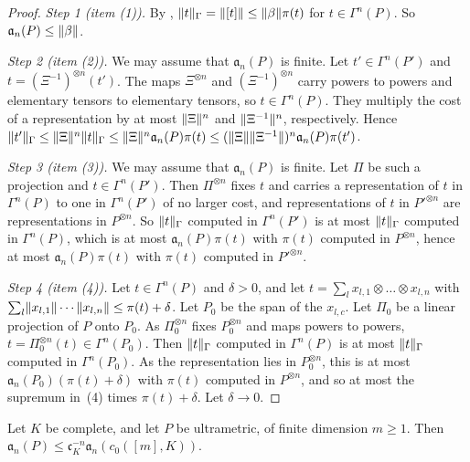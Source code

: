 \begin{proof}
\emph{Step 1 (item (1)).} By \cite[Lemma~Q.1(3)]{I}, $\lVert t\rVert_\Gamma=\lVert [t]\rVert\le\lVert \beta\rVert\pi(t)$ for $t\in\Gamma^n(P)$. So $\mathfrak a_n(P)\le\lVert \beta\rVert$.

\emph{Step 2 (item (2)).} We may assume that $\mathfrak a_n(P)$ is finite. Let $t'\in\Gamma^n(P')$ and $t=(\Xi^{-1})^{\otimes n}(t')$. The maps $\Xi^{\otimes n}$ and $(\Xi^{-1})^{\otimes n}$ carry powers to powers and elementary tensors to elementary tensors, so $t\in\Gamma^n(P)$. They multiply the cost of a representation by at most $\lVert \Xi\rVert^n$ and $\lVert \Xi^{-1}\rVert^n$, respectively. Hence $\lVert t'\rVert_\Gamma\le\lVert \Xi\rVert^n\lVert t\rVert_\Gamma\le\lVert \Xi\rVert^n\mathfrak a_n(P)\pi(t)\le(\lVert \Xi\rVert\lVert \Xi^{-1}\rVert)^n\mathfrak a_n(P)\pi(t')$.

\emph{Step 3 (item (3)).} We may assume that $\mathfrak a_n(P)$ is finite. Let $\Pi$ be such a projection and $t\in\Gamma^n(P')$. Then $\Pi^{\otimes n}$ fixes $t$ and carries a representation of $t$ in $\Gamma^n(P)$ to one in $\Gamma^n(P')$ of no larger cost, and representations of $t$ in $P'^{\otimes n}$ are representations in $P^{\otimes n}$. So $\lVert t\rVert_\Gamma$ computed in $\Gamma^n(P')$ is at most $\lVert t\rVert_\Gamma$ computed in $\Gamma^n(P)$, which is at most $\mathfrak a_n(P)\pi(t)$ with $\pi(t)$ computed in $P^{\otimes n}$, hence at most $\mathfrak a_n(P)\pi(t)$ with $\pi(t)$ computed in $P'^{\otimes n}$.

\emph{Step 4 (item (4)).} Let $t\in\Gamma^n(P)$ and $\delta>0$, and let $t=\sum_lx_{l,1}\otimes\dots\otimes x_{l,n}$ with $\sum_l\lVert x_{l,1}\rVert\cdots\lVert x_{l,n}\rVert\le\pi(t)+\delta$. Let $P_0$ be the span of the $x_{l,c}$. Let $\Pi_0$ be a linear projection of $P$ onto $P_0$. As $\Pi_0^{\otimes n}$ fixes $P_0^{\otimes n}$ and maps powers to powers, $t=\Pi_0^{\otimes n}(t)\in\Gamma^n(P_0)$. Then $\lVert t\rVert_\Gamma$ computed in $\Gamma^n(P)$ is at most $\lVert t\rVert_\Gamma$ computed in $\Gamma^n(P_0)$. As the representation lies in $P_0^{\otimes n}$, this is at most $\mathfrak a_n(P_0)(\pi(t)+\delta)$ with $\pi(t)$ computed in $P^{\otimes n}$, and so at most the supremum in~(4) times $\pi(t)+\delta$. Let $\delta\to0$.
\end{proof}

\begin{lemma}\label{dp:lem:orthogonal}
Let $K$ be complete, and let $P$ be ultrametric, of finite dimension $m\ge1$. Then $\mathfrak a_n(P)\le\mathfrak c_K^{-n}\mathfrak a_n(c_0([m],K))$.
\end{lemma}

